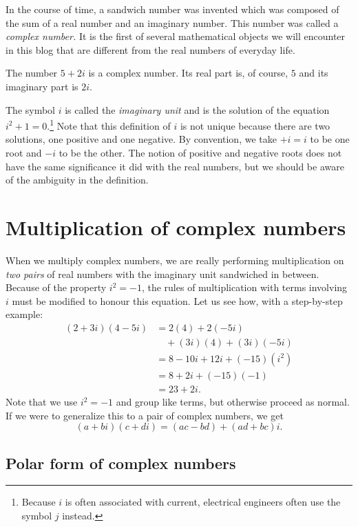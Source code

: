 \documentclass[
  a4paper,
]{article}
\begin{document}
In the course of time, a sandwich number was invented which was composed
of the sum of a real number and an imaginary number. This number was
called a \emph{complex number.} It is the first of several mathematical
objects we will encounter in this blog that are different from the real
numbers of everyday life.

The number \(5 + 2i\) is a complex number. Its real part is, of course,
\(5\) and its imaginary part is \(2i\).

The symbol \(i\) is called the \emph{imaginary unit} and is the solution
of the equation \(i^2 + 1 = 0\).\footnote{Because \(i\) is often
  associated with current, electrical engineers often use the symbol
  \(j\) instead.} Note that this definition of \(i\) is not unique
because there are two solutions, one positive and one negative. By
convention, we take \(+i = i\) to be one root and \(-i\) to be the
other. The notion of positive and negative roots does not have the same
significance it did with the real numbers, but we should be aware of the
ambiguity in the definition.

\hypertarget{multiplication-of-complex-numbers}{%
\section{Multiplication of complex
numbers}\label{multiplication-of-complex-numbers}}

When we multiply complex numbers, we are really performing
multiplication on \emph{two pairs} of real numbers with the imaginary
unit sandwiched in between. Because of the property \(i^2 = -1\), the
rules of multiplication with terms involving \(i\) must be modified to
honour this equation. Let us see how, with a step-by-step example: \[
\begin{aligned}
(2 + 3i)(4 - 5i) & = 2(4) + 2(-5i)\\
& \quad + (3i)(4) + (3i)(-5i)\\
& = 8 - 10i + 12i + (-15)(i^2)\\
& = 8 + 2i + (-15)(-1)\\
& = 23 + 2i.
\end{aligned}
\] Note that we use \(i^2 = -1\) and group like terms, but otherwise
proceed as normal. If we were to generalize this to a pair of complex
numbers, we get \[(a + bi)(c + di) = (ac - bd) + (ad + bc)i.\]

\hypertarget{polar-form-of-complex-numbers}{%
\subsection{Polar form of complex
numbers}\label{polar-form-of-complex-numbers}}
\end{document}
